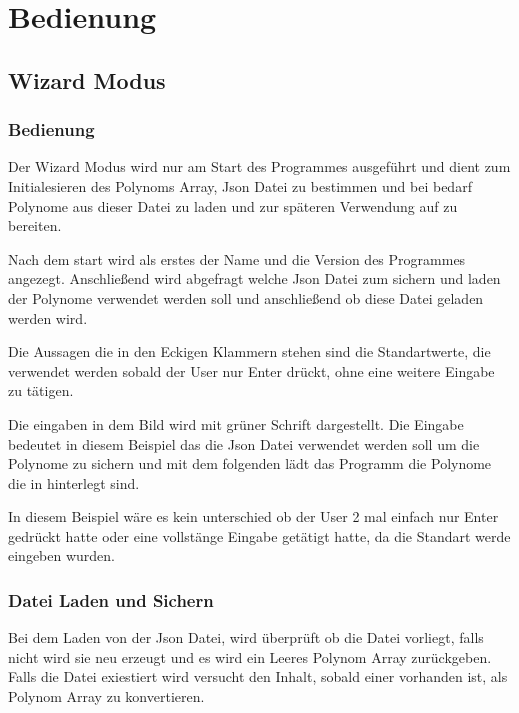 \documentclass[letterpaper,10pt,ngerman]{sphinxmanual}
\begin{document}
\chapter{Bedienung}
\label{index:bedienung}

\section{Wizard Modus}
\label{wizard::doc}\label{wizard:wizard-modus}

\subsection{Bedienung}
\label{wizard:bedienung}
Der Wizard Modus wird nur am Start des Programmes ausgeführt und dient zum Initialesieren
des Polynoms Array, Json Datei zu bestimmen und bei bedarf Polynome aus dieser Datei zu laden
und zur späteren Verwendung auf zu bereiten.

Nach dem start wird als erstes der Name und die Version des Programmes angezegt.
Anschließend wird abgefragt welche Json Datei zum sichern und laden der Polynome verwendet
werden soll und anschließend ob diese Datei geladen werden wird.

Die Aussagen die in den Eckigen Klammern stehen sind die Standartwerte, die verwendet werden sobald der
User nur Enter drückt, ohne eine weitere Eingabe zu tätigen.

\noindent{}

Die eingaben in dem Bild wird mit grüner Schrift dargestellt. Die Eingabe bedeutet in diesem Beispiel das
die Json Datei  verwendet werden soll um die Polynome zu sichern und mit dem folgenden  lädt das
Programm die Polynome die in  hinterlegt sind.

In diesem Beispiel wäre es kein unterschied ob der User 2 mal einfach nur Enter gedrückt hatte oder eine
vollstänge Eingabe getätigt hatte, da die Standart werde eingeben wurden.


\subsection{Datei Laden und Sichern}
\label{wizard:datei-laden-und-sichern}
Bei dem Laden von der Json Datei, wird überprüft ob die Datei vorliegt, falls nicht wird sie neu erzeugt und
es wird ein Leeres Polynom Array zurückgeben. Falls die Datei exiestiert wird versucht den Inhalt, sobald
einer vorhanden ist, als Polynom Array zu konvertieren.
\end{document}

